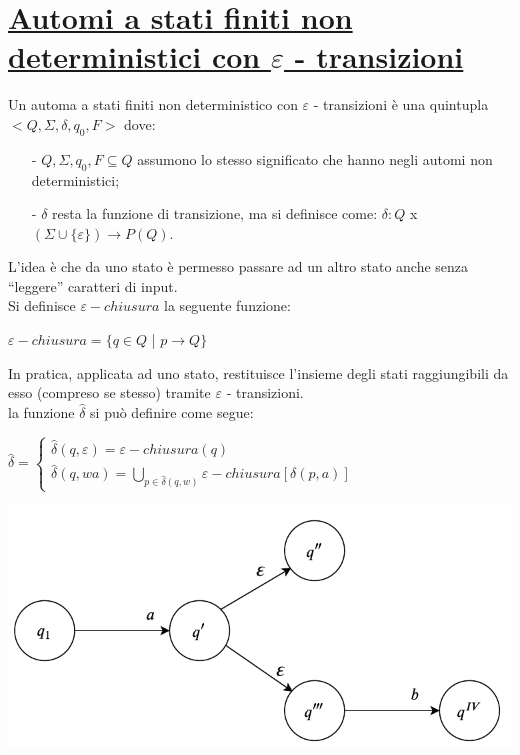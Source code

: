 \documentclass[a4paper, 10pt]{report}
\begin{document}
\section*{\underline{Automi a stati finiti non deterministici con $\varepsilon$ - transizioni}}
Un automa a stati finiti non deterministico con $\varepsilon$ - transizioni è una quintupla $<Q, \Sigma, \delta, q_0, F>$ dove:
\begin{itemize}
\item[-] $Q, \Sigma, q_0, F \subseteq Q$ assumono lo stesso significato che hanno negli automi non deterministici;
\item[-] $\delta$ resta la funzione di transizione, ma si definisce come: $\delta: Q$ x $(\Sigma \cup \{ \varepsilon\}) \rightarrow P(Q)$.
\end{itemize}

\noindent L’idea è che da uno stato è permesso passare ad un altro stato anche senza “leggere”
caratteri di input.\\

\noindent Si definisce $\varepsilon - chiusura$ la seguente funzione:
\begin{center}
$\varepsilon - chiusura = \{ q \in Q$ | $p \rightarrow Q\}$
\end{center}

\noindent In pratica, applicata ad uno stato, restituisce l'insieme degli stati raggiungibili da esso (compreso se stesso) tramite $\varepsilon$ - transizioni.\\

\noindent la funzione $\hat{\delta}$ si può definire come segue:

\begin{center}
$\hat{\delta} = 
\begin{cases} 
\hat{\delta}(q, \varepsilon) = \varepsilon - chiusura(q) & \\

\hat{\delta}(q, wa) = \bigcup_{p \in \hat{\delta}(q, w)} \varepsilon - chiusura[\delta(p, a)]
\end{cases} $
\end{center}

\begin{center}
\includegraphics[scale=1]{16ottobre06.pdf}
\end{center}
\end{document}
